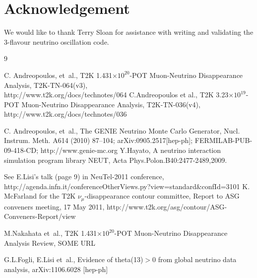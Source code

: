 \documentclass[final]{elsarticle}
\begin{document}









\section*{Acknowledgement}

We would like to thank Terry Sloan for assistance with writing and validating the 3-flavour neutrino 
oscillation code.

%
%

\begin{thebibliography}{9}

  C. Andreopoulos, et~al.,
   T2K 1.431$\times10^{20}$-POT Muon-Neutrino Disappearance Analysis,
   T2K-TN-064(v3),\\
   http://www.t2k.org/docs/technotes/064
   C.Andreopoulos et al.,
   T2K 3.23$\times10^{19}$-POT Muon-Neutrino Disappearance Analysis,
   T2K-TN-036(v4),\\
   http://www.t2k.org/docs/technotes/036

  C. Andreopoulos, et~al., {The GENIE Neutrino Monte Carlo Generator},
  Nucl. Instrum. Meth. A614 (2010) 87--104;
  arXiv:0905.2517[hep-ph];
  FERMILAB-PUB-09-418-CD; http://www.genie-mc.org
  Y.Hayato, A neutrino interaction simulation program library NEUT,
  Acta Phys.Polon.B40:2477-2489,2009.

  See E.Lisi's talk (page 9) in NeuTel-2011 conference,\\
  http://agenda.infn.it/conferenceOtherViews.py?view=standard\&confId=3101
  K. McFarland for the T2K $\nu_{\mu}$-disappearance contour committee, 
  Report to ASG conveners meeting, 17 May 2011,
  http://www.t2k.org/asg/contour/ASG-Conveners-Report/view

  M.Nakahata et~al., 
  T2K 1.431$\times10^{20}$-POT Muon-Neutrino Disappearance Analysis Review,
  SOME URL

  G.L.Fogli, E.Lisi et~al.,
  Evidence of theta(13)$>$0 from global neutrino data analysis,
  arXiv:1106.6028 [hep-ph]


\end{thebibliography}
\end{document}

